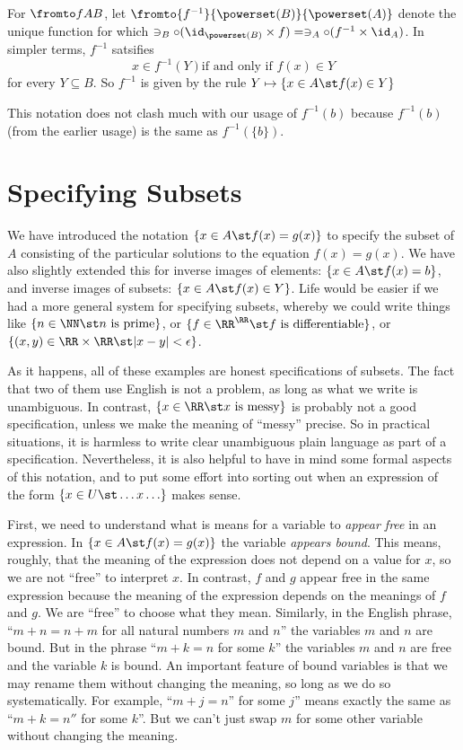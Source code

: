 \begin{defn}
	For $\fromto fAB$, let $\fromto {f^{-1}}{\powerset(B)}{\powerset(A)}$ denote
	the unique function for which $\ni_B\circ (\id_{\powerset(B)}\times f) = \ni_A\circ(f^{-1}\times \id_A)$. In simpler terms, $f^{-1}$ satsifies
\[x\in f^{-1}(Y) \text{if and only if } f(x)\in Y\]
for every $Y\subseteq B$.  So $f^{-1}$ is given by the rule $Y\mapsto \{x\in A\st f(x)\in Y\}$
\end{defn}

This notation does not clash much with our usage of $f^{-1}(b)$ because 
$f^{-1}(b)$ (from the earlier usage) is the same as $f^{-1}(\{b\})$.

\section{Specifying Subsets}

We have introduced the notation $\{x\in A\st f(x)=g(x)\}$ to specify the subset of $A$ consisting of the particular solutions to the equation $f(x)=g(x)$. 
We have also slightly extended this for inverse images of elements: $\{x\in A \st f(x)=b\}$, and inverse images of subsets: $\{x\in A\st f(x)\in Y\}$. 
Life would be easier if we had a more general system for specifying subsets, whereby we could write things like $\{n\in \NN \st \text{$n$ is prime}\}$, or $\{f\in \RR^\RR\st \text{$f$ is differentiable}\}$, or $\{(x,y)\in \RR\times \RR\st |x-y| < \epsilon\}$. 

As it happens, all of these examples are honest specifications of subsets. 
The fact that two of them use English is not a problem, as long as what we write is unambiguous. 
In contrast, $\{x\in \RR\st \text{$x$ is messy}\}$ is probably not a good specification, unless we make the meaning of ``messy'' precise. 
So in practical situations, it is harmless to write clear unambiguous plain language as part of a specification. 
Nevertheless, it is also helpful to have in mind some formal aspects of this notation, and to put some effort into sorting out when an expression of the form
$\{x\in U\st \ldots x \ldots\}$ makes sense.

First, we need to understand what is means for a variable to \emph{appear free} in an expression.
In $\{x\in A \st f(x)=g(x)\}$ the variable \emph{appears bound}.
This means, roughly, that the meaning of the expression does not depend on a value for $x$, so we are not ``free'' to interpret $x$.
In contrast, $f$ and $g$ appear free in the same expression because the meaning of the expression depends on the meanings of $f$ and $g$.
We are ``free'' to choose what they mean.
Similarly, in the English phrase, ``$m + n = n + m$ for all natural numbers $m$ and $n$'' the variables $m$ and $n$ are bound.
But in the phrase ``$m+k = n$ for some $k$'' the variables $m$ and $n$ are free and the variable $k$ is bound.
An important feature of bound variables is that we may rename them without changing the meaning, so long as we do so systematically.
For example, ``$m+j=n$'' for some $j$'' means exactly the same as ``$m+k=n''$ for some $k$''.
But we can't just swap $m$ for some other variable without changing the meaning. 

